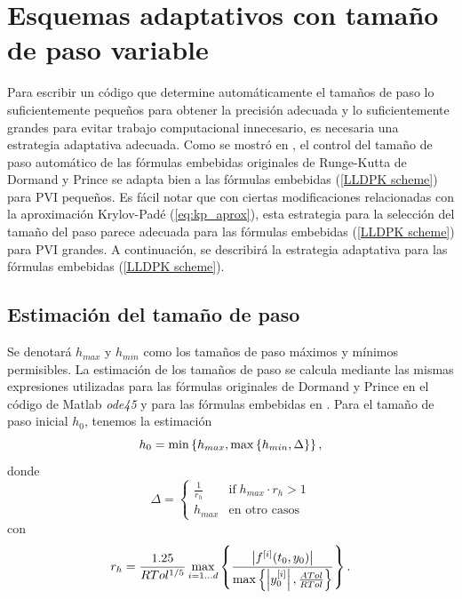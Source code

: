\section{Esquemas adaptativos con tamaño de paso variable}
Para escribir un código que determine automáticamente el tamaños de paso lo suficientemente pequeños para obtener la precisión adecuada y lo suficientemente grandes para evitar trabajo computacional innecesario, es necesaria una estrategia adaptativa adecuada. Como se mostró en \cite{Jimenez14AMC}, el control del tamaño de paso automático de las fórmulas embebidas originales de Runge-Kutta de Dormand y Prince se adapta bien a las fórmulas embebidas (\ref{LLDPK scheme}) para PVI pequeños. Es fácil notar que con ciertas modificaciones relacionadas con la aproximación Krylov-Padé (\ref{eq:kp_aprox}), esta estrategia para la selección del tamaño del paso parece adecuada para las fórmulas embebidas (\ref{LLDPK scheme}) para PVI grandes. A continuación, se describirá la estrategia adaptativa para las fórmulas embebidas (\ref{LLDPK scheme}).

\subsection{Estimación del tamaño de paso}\label{secc:stepsizes}
Se denotará $h_{max}$ y $h_{min}$ como los tamaños de paso máximos y mínimos permisibles. La estimación de los tamaños de paso se calcula mediante las mismas expresiones utilizadas para las fórmulas originales de Dormand y Prince en el código de Matlab \textit{ode45} \cite{shampine1997matlab} y para las fórmulas embebidas en \cite{Jimenez14AMC}. Para el tamaño de paso inicial $h_0$, tenemos la estimación
\begin{equation}
    h_0 = \min\left\{  h_{max}, \max\left\{  h_{min} ,\Delta \right\}  \right\}, \label{hcero}
\end{equation}
donde
\begin{equation*}
    \Delta = \begin{cases}
        \frac{1}{r_h} & \text{if} \; h_{max}\cdot r_h>1\\
        h_{max} & \text{en otro casos}
        \end{cases}
\end{equation*}
con
\begin{equation*}
     r_h = \frac{1\mathord{.}25}{RTol^{1/5}}\max_{i=1\ldots d}\left\{\frac{ \left\lvert f^{[i]}(t_0,y_0) \right\rvert }
    {\max\left\{ \left\lvert y^{[i]}_0 \right\rvert ,\frac{ATol}{RTol} \right\}}\right\}.
\end{equation*}

